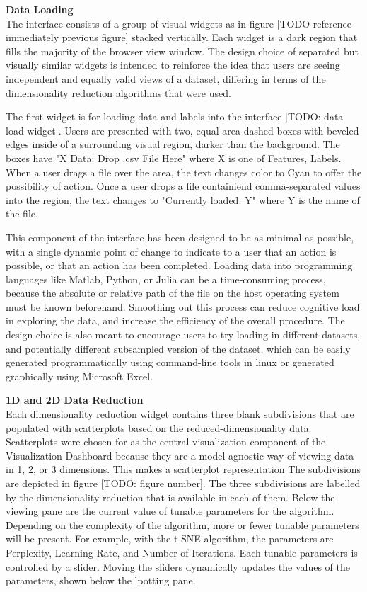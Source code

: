 \documentclass{sigchi}
\begin{document}
\textbf{Data Loading} \\
The interface consists of a group of visual widgets as in figure [TODO reference immediately previous figure] stacked vertically. Each widget is a dark region that fills the majority of the browser view window. The design choice of separated but visually similar widgets is intended to reinforce the idea that users are seeing independent and equally valid views of a dataset, differing in terms of the dimensionality reduction algorithms that were used.


The first widget is for loading data and labels into the interface [TODO: data load widget]. Users are presented with two, equal-area dashed boxes with beveled edges inside of a surrounding visual region, darker than the background. The boxes have "X Data: Drop .csv File Here" where X is one of Features, Labels. When a user drags a file over the area, the text changes color to Cyan to offer the possibility of action. Once a user drops a file containiend comma-separated values into the region, the text changes to "Currently loaded: Y" where Y is the name of the file. 

This component of the interface has been designed to be as minimal as possible, with a single dynamic point of change to indicate to a user that an action is possible, or that an action has been completed. Loading data into programming languages like Matlab, Python, or Julia can  be a time-consuming process, because the absolute or relative path of the file on the host operating system must be known beforehand. Smoothing out this process can reduce cognitive load in exploring the data, and increase the efficiency of the overall procedure. The design choice is also meant to encourage users to try loading in different datasets, and potentially different subsampled version of the dataset, which can be easily generated programmatically using command-line tools in linux or generated graphically using Microsoft Excel.

\textbf{1D and 2D Data Reduction} \\
Each dimensionality reduction widget contains three blank subdivisions that are populated with scatterplots based on the reduced-dimensionality data. Scatterplots were chosen for as the central visualization component of the Visualization Dashboard because they are a model-agnostic way of viewing data in 1, 2, or 3 dimensions. This makes a scatterplot representation  The subdivisions are depicted in figure [TODO: figure number]. The three subdivisions are labelled by the dimensionality reduction that is available in each of them. Below the viewing pane are the current value of tunable parameters for the algorithm. Depending on the complexity of the algorithm, more or fewer tunable parameters will be present. For example, with the t-SNE algorithm, the parameters are Perplexity, Learning Rate, and Number of Iterations. Each tunable parameters is controlled by a slider. Moving the sliders dynamically updates the values of the parameters, shown below the lpotting pane.
\end{document}
